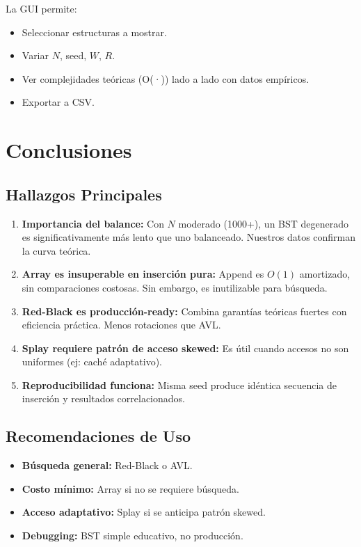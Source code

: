 \documentclass[12pt,a4paper]{article}
\begin{document}
La GUI permite:
\begin{itemize}
    \item Seleccionar estructuras a mostrar.
    \item Variar $N$, seed, $W$, $R$.
    \item Ver complejidades teóricas (O(·)) lado a lado con datos empíricos.
    \item Exportar a CSV.
\end{itemize}

\section{Conclusiones}

\subsection{Hallazgos Principales}

\begin{enumerate}
    \item \textbf{Importancia del balance:} Con $N$ moderado (1000+), un BST degenerado es significativamente más lento que uno balanceado. Nuestros datos confirman la curva teórica.

    \item \textbf{Array es insuperable en inserción pura:} Append es $O(1)$ amortizado, sin comparaciones costosas. Sin embargo, es inutilizable para búsqueda.

    \item \textbf{Red-Black es producción-ready:} Combina garantías teóricas fuertes con eficiencia práctica. Menos rotaciones que AVL.

    \item \textbf{Splay requiere patrón de acceso skewed:} Es útil cuando accesos no son uniformes (ej: caché adaptativo).

    \item \textbf{Reproducibilidad funciona:} Misma seed produce idéntica secuencia de inserción y resultados correlacionados.
\end{enumerate}

\subsection{Recomendaciones de Uso}

\begin{itemize}
    \item \textbf{Búsqueda general:} Red-Black o AVL.
    \item \textbf{Costo mínimo:} Array si no se requiere búsqueda.
    \item \textbf{Acceso adaptativo:} Splay si se anticipa patrón skewed.
    \item \textbf{Debugging:} BST simple educativo, no producción.
\end{itemize}
\end{document}
